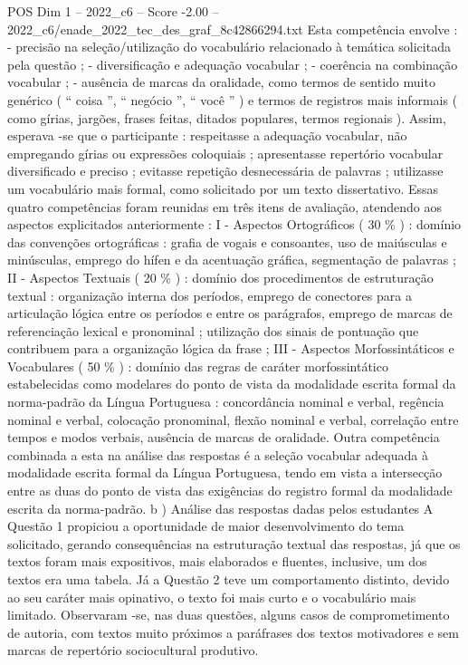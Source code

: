 \begin{textsample}{POS Dim 1 – 2022\_c6 – Score -2.00 – 2022\_c6/enade\_2022\_tec\_des\_graf\_8c42866294.txt}
Esta competência envolve : - precisão na seleção/utilização do vocabulário relacionado à temática solicitada pela questão ; - diversificação e adequação vocabular ; - coerência na combinação vocabular ; - ausência de marcas da oralidade, como termos de sentido muito genérico ( “ coisa ”, “ negócio ”, “ você ” ) e termos de registros mais informais ( como gírias, jargões, frases feitas, ditados populares, termos regionais ).
Assim, esperava -se que o participante : respeitasse a adequação vocabular, não empregando gírias ou expressões coloquiais ; apresentasse repertório vocabular diversificado e preciso ; evitasse repetição desnecessária de palavras ; utilizasse um vocabulário mais formal, como solicitado por um texto dissertativo.
Essas quatro competências foram reunidas em três itens de avaliação, atendendo aos aspectos explicitados anteriormente : I - Aspectos Ortográficos ( 30 \% ) : domínio das convenções ortográficas : grafia de vogais e consoantes, uso de maiúsculas e minúsculas, emprego do hífen e da acentuação gráfica, segmentação de palavras ; II - Aspectos Textuais ( 20 \% ) : domínio dos procedimentos de estruturação textual : organização interna dos períodos, emprego de conectores para a articulação lógica entre os períodos e entre os parágrafos, emprego de marcas de referenciação lexical e pronominal ; utilização dos sinais de pontuação que contribuem para a organização lógica da frase ; III - Aspectos Morfossintáticos e Vocabulares ( 50 \% ) : domínio das regras de caráter morfossintático estabelecidas como modelares do ponto de vista da modalidade escrita formal da norma-padrão da Língua Portuguesa : concordância nominal e verbal, regência nominal e verbal, colocação pronominal, flexão nominal e verbal, correlação entre tempos e modos verbais, ausência de marcas de oralidade.
Outra competência combinada a esta na análise das respostas é a seleção vocabular adequada à modalidade escrita formal da Língua Portuguesa, tendo em vista a intersecção entre as duas do ponto de vista das exigências do registro formal da modalidade escrita da norma-padrão. b ) Análise das respostas dadas pelos estudantes A Questão 1 propiciou a oportunidade de maior desenvolvimento do tema solicitado, gerando consequências na estruturação textual das respostas, já que os textos foram mais expositivos, mais elaborados e fluentes, inclusive, um dos textos era uma tabela.
Já a Questão 2 teve um comportamento distinto, devido ao seu caráter mais opinativo, o texto foi mais curto e o vocabulário mais limitado.
Observaram -se, nas duas questões, alguns casos de comprometimento de autoria, com textos muito próximos a paráfrases dos textos motivadores e sem marcas de repertório sociocultural produtivo.

\end{textsample}
